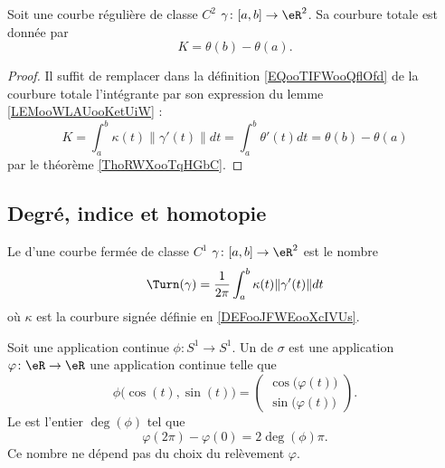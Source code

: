 \begin{lemma}
    Soit une courbe régulière de classe \( C^2\) \( \gamma\colon \mathopen[ a , b \mathclose]\to \eR^2\). Sa courbure totale est donnée par
    \begin{equation}
        K=\theta(b)-\theta(a).
    \end{equation}
\end{lemma}

\begin{proof}
    Il suffit de remplacer dans la définition \eqref{EQooTIFWooQflOfd} de la courbure totale l'intégrante par son expression 
    du lemme \ref{LEMooWLAUooKetUiW} : 
    \begin{equation}
        K=\int_a^b\kappa(t)\| \gamma'(t) \|dt=\int_a^b\theta'(t)dt=\theta(b)-\theta(a)
    \end{equation}
    par le théorème \ref{ThoRWXooTqHGbC}.
\end{proof}

\subsection{Degré, indice et homotopie}

\begin{definition}
    Le  d'une courbe fermée de classe \( C^1\) \( \gamma\colon \mathopen[ a , b \mathclose]\to \eR^2\) est le nombre
    \begin{equation}
        \Turn(\gamma)=\frac{1}{ 2\pi }\int_a^b\kappa(t)\| \gamma'(t) \|dt
    \end{equation}
    où \( \kappa\) est la courbure signée définie en \ref{DEFooJFWEooXcIVUs}.
\end{definition}

\begin{lemmaDef}        \label{DEFooTKBUooNVcheO}
    Soit une application continue \( \phi\colon S^1\to S^1\). Un  de \( \sigma\) est une application \( \varphi\colon \eR\to \eR\) une application continue telle que
    \begin{equation}
        \phi\big( \cos(t),\sin(t) \big)=\begin{pmatrix}
            \cos\big( \varphi(t) \big)    \\ 
            \sin\big( \varphi(t) \big)    
        \end{pmatrix}.
    \end{equation}
    Le  est l'entier \( \deg(\phi)\) tel que
    \begin{equation}
        \varphi(2\pi)-\varphi(0)=2\deg(\phi)\pi.
    \end{equation}
    Ce nombre ne dépend pas du choix du relèvement \( \varphi\).
\end{lemmaDef}

